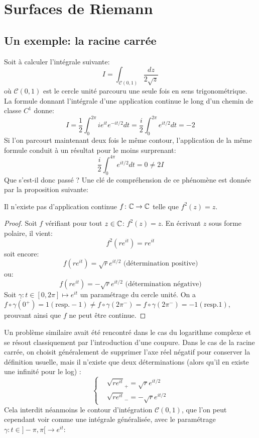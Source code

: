 \chapter{Surfaces de Riemann}
\section{Un exemple: la racine carrée}
Soit à calculer l'intégrale suivante:
\[
I = \int_{\mathcal{C}(0,1)} \frac{dz}{2 \sqrt{z}}
\]
où $\mathcal{C}(0,1)$ est le cercle unité parcouru une seule fois en sens trigonométrique. La formule donnant l'intégrale d'une application continue le long d'un chemin de classe $C^1$ donne:
\[
I = \frac{1}{2} \int_0^{2\pi} i e^{it}e^{-it/2} dt = \frac{i}{2} \int_0^{2\pi} e^{it/2} dt= -2
\]
Si l'on parcourt maintenant deux fois le même contour, l'application de la même formule conduit à un résultat pour le moins surprenant:
\[
\frac{i}{2} \int_{0}^{4 \pi} e^{it/2} dt= 0 \neq 2 I 
\]
Que s'est-il donc passé ? Une clé de compréhension de ce phénomène est donnée par la proposition suivante:
\begin{prop}
Il n'existe pas d'application continue $f \colon \mathbb{C} \to \mathbb{C}$ telle que $f^2(z) = z$.
\end{prop}
\begin{proof}
Soit $f$ vérifiant pour tout $z\in \mathbb{C}$: $f^2(z)=z$. En écrivant $z$ sous forme polaire, il vient:
\[
f^2\left(r e^{it}\right) = r e^{it}
\]
soit encore:
\[
f\left(r e^{it}\right) = \sqrt{r} e^{it/2} \text{ (détermination positive)}
\]
ou:
\[
f\left(r e^{it}\right) = - \sqrt{r} e^{it/2} \text{ (détermination négative)}
\]
Soit $\gamma \colon t \in [0,2\pi] \mapsto e^{it}$ un paramétrage du cercle unité. On a $f\circ \gamma(0^+)= 1 (\text{resp.} -1) \neq f\circ \gamma(2 \pi^-)= f \circ \gamma(2\pi^-)=-1(\text{resp.} 1)$, prouvant ainsi que $f$ ne peut être continue.
\end{proof}
Un problème similaire avait été rencontré dans le cas du logarithme complexe et se résout classiquement par l'introduction d'une coupure. Dans le cas de la racine carrée, on choisit généralement de supprimer l'axe réel négatif pour conserver la définition usuelle, mais il n'existe que deux déterminations (alors qu'il en existe une infinité pour le log) :
\[
\begin{cases}
&\sqrt{r e^{it}}_+ = \sqrt{r} e^{it/2} \\
&\sqrt{r e^{it}}_- = -\sqrt{r} e^{it/2}
\end{cases}
\]
Cela interdit néanmoins le contour d'intégration $\mathcal{C}(0,1)$, que l'on peut cependant voir comme une intégrale généralisée, avec le paramétrage $\gamma \colon t \in ]-\pi,\pi[ \to e^{it}$:
